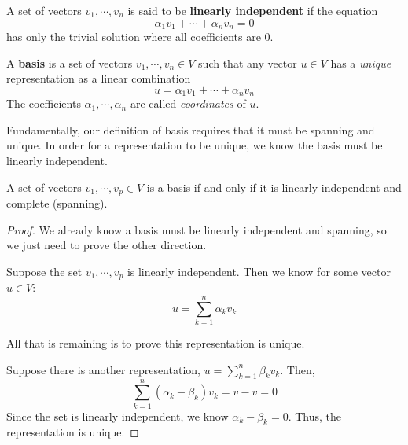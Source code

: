 \begin{definition}
A set of vectors $v_{1}, \cdots, v_{n}$ is said to be \textbf{linearly independent} if the equation 
$$\alpha_{1} v_{1} + \cdots + \alpha_{n} v_{n} = 0$$
has only the trivial solution where all coefficients are 0. 
\end{definition}

\begin{definition}
A \textbf{basis} is a set of vectors $v_{1}, \cdots , v_{n} \in V$ such that any vector $u \in V$ has a \textit{unique} representation as a linear combination 
$$u = \alpha_{1} v_{1} + \cdots + \alpha_{n} v_{n}$$
The coefficients $\alpha_{1}, \cdots, \alpha_{n}$ are called \textit{coordinates} of $u$.
\end{definition}

Fundamentally, our definition of basis requires that it must be spanning and unique. In order for a representation to be unique, we know the basis must be linearly independent. 

\begin{theorem}
A set of vectors $v_{1}, \cdots, v_{p} \in V$ is a basis if and only if it is linearly independent and complete (spanning). 
\end{theorem}

\begin{proof}
We already know a basis must be linearly independent and spanning, so we just need to prove the other direction. 

Suppose the set $v_{1}, \cdots, v_{p}$ is linearly independent. Then we know for some vector $u \in V$:
$$u = \sum_{k=1}^{n} \alpha_{k} v_{k}$$

All that is remaining is to prove this representation is unique. 

Suppose there is another representation, $u = \sum_{k=1}^{n} \beta_{k} v_{k}$. Then, 
$$\sum_{k=1}^{n} (\alpha_{k} - \beta_{k}) v_{k} = v - v = 0$$
Since the set is linearly independent, we know $\alpha_{k} - \beta_{k} = 0$. Thus, the representation is unique. 
\end{proof}

